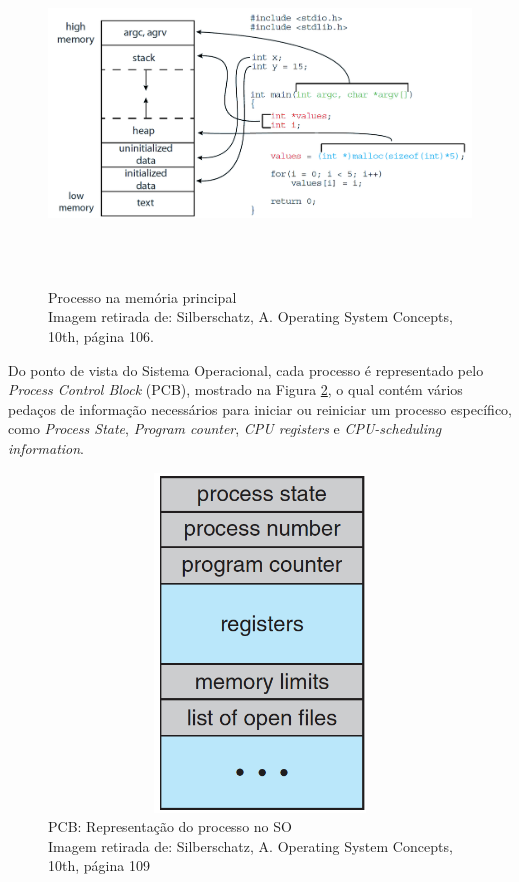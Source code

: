 \begin{figure}[h!]
\centering
\includegraphics[keepaspectratio, width=12cm, height=9cm]{imagens/03/03 - Alocação de memória de um programa c.png}
\caption{Processo na memória principal \\
Imagem retirada de: Silberschatz, A. Operating System Concepts, 10th,
página 106. \\}
\label{fig:Processo na memória principal}
\end{figure}

Do ponto de vista do Sistema Operacional, cada processo é representado
pelo \emph{Process Control Block} (PCB), mostrado na Figura \ref{fig:PCB: Representação do processo no SO}, o qual
contém vários pedaços de informação necessários para iniciar ou
reiniciar um processo específico, como \emph{Process State},
\emph{Program counter}, \emph{CPU registers} e \emph{CPU-scheduling
information}.

\begin{figure}[h!]
\centering
\includegraphics[keepaspectratio, width=12cm, height=9cm]{imagens/05/05 - Process Block Control (PCB).png}
\caption{PCB: Representação do processo no SO   \\
Imagem retirada de: Silberschatz, A. Operating System Concepts, 10th,
página 109 \\}
\label{fig:PCB: Representação do processo no SO}
\end{figure}



